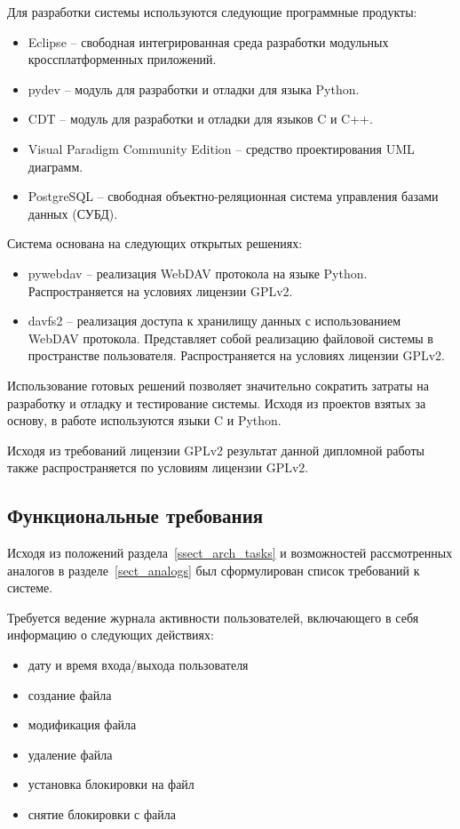 \documentclass[utf8,usehyperref,12pt]{G7-32}
\begin{document}
Для разработки системы используются следующие программные продукты:
\begin{itemize}
 \item Eclipse -- свободная интегрированная среда разработки модульных кроссплатформенных приложений.
 \item pydev -- модуль для разработки и отладки для языка Python.
 \item CDT -- модуль для разработки и отладки для языков C и C++.
 \item Visual Paradigm Community Edition -- средство проектирования UML диаграмм.
 \item PostgreSQL -- свободная объектно-реляционная система управления базами данных (СУБД).  
\end{itemize}

Система основана на следующих открытых решениях:
\begin{itemize}
 \item pywebdav -- реализация WebDAV протокола на языке Python. Распространяется на условиях лицензии GPLv2.
 \item davfs2 -- реализация доступа к хранилищу данных с использованием WebDAV протокола. Представляет собой реализацию файловой системы в пространстве пользователя. Распространяется на условиях лицензии GPLv2.
\end{itemize}

Использование готовых решений позволяет значительно сократить затраты на разработку и отладку и тестирование системы. Исходя из проектов взятых за основу, в работе используются языки C и Python. 

Исходя из требований лицензии GPLv2 результат данной дипломной работы также распространяется по условиям лицензии GPLv2.

\subsection{Функциональные требования}\label{ssect_req}

Исходя из положений раздела~\ref{ssect_arch_tasks} и возможностей рассмотренных аналогов в разделе~\ref{sect_analogs} был сформулирован список требований к системе.

Требуется ведение журнала активности пользователей, включающего в себя информацию о следующих действиях: 
\begin{itemize}
\item дату и время входа/выхода пользователя
\item создание файла
\item модификация файла
\item удаление файла
\item установка блокировки на файл
\item снятие блокировки с файла
\end{itemize}
\end{document}

